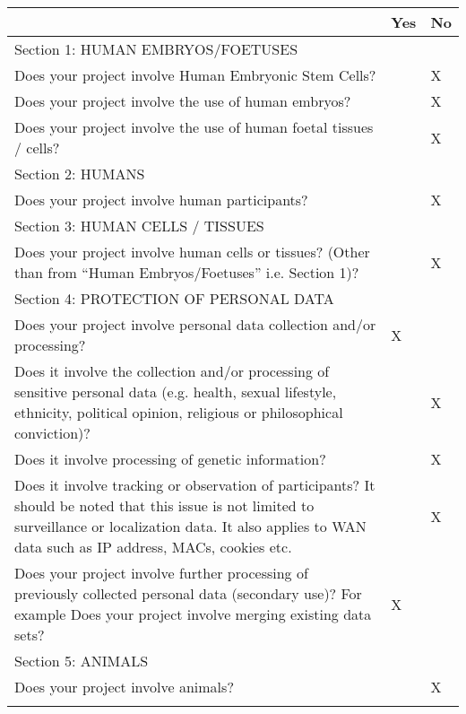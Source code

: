 \begin{longtable}{|p{12cm}|p{1cm}|p{1cm}|}
\endhead

\hline & Yes & No \\ \hline
\rowcolor[HTML]{FFFE65} 
Section 1: HUMAN EMBRYOS/FOETUSES &     &    \\ \hline
Does your project involve Human Embryonic Stem Cells? &     & X  \\ \hline
Does your project involve the use of human embryos?  &     & X  \\ \hline
Does your project involve the use of human foetal tissues / cells?     &     & X  \\ \hline
\rowcolor[HTML]{FFFE65} 
Section 2: HUMANS     &     &    \\ \hline
Does your project involve human participants?    &     & X  \\ \hline
\rowcolor[HTML]{FFFE65} 
Section 3: HUMAN CELLS / TISSUES &     &    \\ \hline
Does your project involve human cells or tissues? (Other than from “Human Embryos/Foetuses” i.e. Section 1)?  &     & X  \\ \hline
\rowcolor[HTML]{FFFE65} 
Section 4: PROTECTION OF PERSONAL DATA  &     &    \\ \hline
Does your project involve personal data collection and/or processing? &     X &   \\ \hline
Does it involve the collection and/or processing of sensitive personal data (e.g. health, sexual lifestyle, ethnicity, political opinion, religious or philosophical conviction)?  &     & X  \\ \hline
Does it involve processing of genetic information? &     & X  \\ \hline
Does it involve tracking or observation of participants? It should be noted that this issue is not limited to surveillance or localization data. It also applies to WAN data such as IP address, MACs, cookies etc.  &     & X  \\ \hline
Does your project involve further processing of previously collected personal data (secondary use)? For example Does your project involve merging existing data sets?                     &  X   &   \\ \hline
\rowcolor[HTML]{FFFE65} 
Section 5: ANIMALS                                              &     &    \\ \hline
Does your project involve animals?                             &     & X  \\ \hline
\rowcolor[HTML]{FFFE65} 

\end{longtable}
